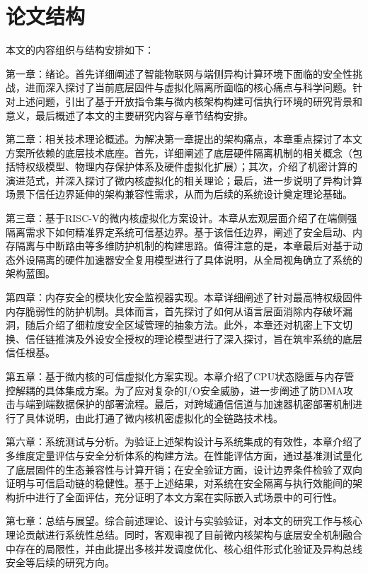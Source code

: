\documentclass[master, vlined, review]{DissertUESTC}
\begin{document}
	\section{论文结构}
	本文的内容组织与结构安排如下：
	
	第一章：绪论。首先详细阐述了智能物联网与端侧异构计算环境下面临的安全性挑战，进而深入探讨了当前底层固件与虚拟化隔离所面临的核心痛点与科学问题。针对上述问题，引出了基于开放指令集与微内核架构构建可信执行环境的研究背景和意义，最后概述了本文的主要研究内容与章节结构安排。
	
	第二章：相关技术理论概述。为解决第一章提出的架构痛点，本章重点探讨了本文方案所依赖的底层技术底座。首先，详细阐述了底层硬件隔离机制的相关概念（包括特权级模型、物理内存保护体系及硬件虚拟化扩展）；其次，介绍了机密计算的演进范式，并深入探讨了微内核虚拟化的相关理论；最后，进一步说明了异构计算场景下信任边界延伸的架构兼容性需求，从而为后续的系统设计奠定理论基础。
	
	第三章：基于RISC-V的微内核虚拟化方案设计。本章从宏观层面介绍了在端侧强隔离需求下如何精准界定系统可信基边界。基于该信任边界，阐述了安全启动、内存隔离与中断路由等多维防护机制的构建思路。值得注意的是，本章最后对基于动态外设隔离的硬件加速器安全复用模型进行了具体说明，从全局视角确立了系统的架构蓝图。
	
	第四章：内存安全的模块化安全监视器实现。本章详细阐述了针对最高特权级固件内存脆弱性的防护机制。具体而言，首先探讨了如何从语言层面消除内存破坏漏洞，随后介绍了细粒度安全区域管理的抽象方法。此外，本章还对机密上下文切换、信任链推演及外设安全授权的理论模型进行了深入探讨，旨在筑牢系统的底层信任根基。
	
	第五章：基于微内核的可信虚拟化方案实现。本章介绍了CPU状态隐匿与内存管控解耦的具体集成方案。为了应对复杂的I/O安全威胁，进一步阐述了防DMA攻击与端到端数据保护的部署流程。最后，对跨域通信信道与加速器机密部署机制进行了具体说明，由此打通了微内核机密虚拟化的全链路技术栈。
	
	第六章：系统测试与分析。为验证上述架构设计与系统集成的有效性，本章介绍了多维度定量评估与安全分析体系的构建方法。在性能评估方面，通过基准测试量化了底层固件的生态兼容性与计算开销；在安全验证方面，设计边界条件检验了双向证明与可信启动链的稳健性。基于上述结果，对系统在安全隔离与执行效能间的架构折中进行了全面评估，充分证明了本文方案在实际嵌入式场景中的可行性。
	
	第七章：总结与展望。综合前述理论、设计与实验验证，对本文的研究工作与核心理论贡献进行系统性总结。同时，客观审视了目前微内核架构与底层安全机制融合中存在的局限性，并由此提出多核并发调度优化、核心组件形式化验证及异构总线安全等后续的研究方向。
	
\end{document}
